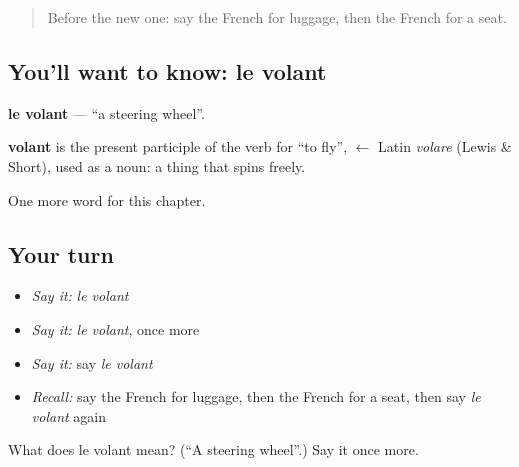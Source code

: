 \begin{quote}
Before the new one: say the French for luggage, then the French for a seat.
\end{quote}

\subsection*{You'll want to know: le volant}
\textbf{le volant} — \textquotedblleft{}a steering wheel\textquotedblright{}.

\begin{cousinweb}
\textbf{volant} is the present participle of the verb for \textquotedblleft{}to fly\textquotedblright{}, $\leftarrow$ Latin \emph{volare} (Lewis \& Short), used as a noun: a thing that spins freely.
\end{cousinweb}

\begin{grammarlens}[title={What you've built}]
One more word for this chapter.
\end{grammarlens}

\subsection*{Your turn}
\begin{itemize}
\raggedright
  \item \emph{Say it:} \emph{le volant}
  \item \emph{Say it:} \emph{le volant}, once more
  \item \emph{Say it:} say \emph{le volant}
  \item \emph{Recall:} say the French for luggage, then the French for a seat, then say \emph{le volant} again
\end{itemize}

\begin{tcolorbox}[breakable,colback=teal!4,colframe=teal!35!black,title={Before you move on}]
What does le volant mean? (\textquotedblleft{}A steering wheel\textquotedblright{}.) Say it once more.
\end{tcolorbox}
